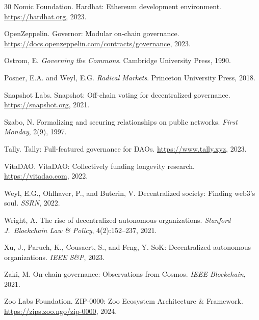 \documentclass[11pt,letterpaper]{article}
\begin{document}
\begin{thebibliography}{30}
Nomic Foundation.
\newblock Hardhat: Ethereum development environment.
\newblock \url{https://hardhat.org}, 2023.

OpenZeppelin.
\newblock Governor: Modular on-chain governance.
\newblock \url{https://docs.openzeppelin.com/contracts/governance}, 2023.

Ostrom, E.
\newblock \emph{Governing the Commons}.
\newblock Cambridge University Press, 1990.

Posner, E.A. and Weyl, E.G.
\newblock \emph{Radical Markets}.
\newblock Princeton University Press, 2018.

Snapshot Labs.
\newblock Snapshot: Off-chain voting for decentralized governance.
\newblock \url{https://snapshot.org}, 2021.

Szabo, N.
\newblock Formalizing and securing relationships on public networks.
\newblock \emph{First Monday}, 2(9), 1997.

Tally.
\newblock Tally: Full-featured governance for DAOs.
\newblock \url{https://www.tally.xyz}, 2023.

VitaDAO.
\newblock VitaDAO: Collectively funding longevity research.
\newblock \url{https://vitadao.com}, 2022.

Weyl, E.G., Ohlhaver, P., and Buterin, V.
\newblock Decentralized society: Finding web3's soul.
\newblock \emph{SSRN}, 2022.

Wright, A.
\newblock The rise of decentralized autonomous organizations.
\newblock \emph{Stanford J.\ Blockchain Law \& Policy}, 4(2):152--237, 2021.

Xu, J., Paruch, K., Cousaert, S., and Feng, Y.
\newblock SoK: Decentralized autonomous organizations.
\newblock \emph{IEEE S\&P}, 2023.

Zaki, M.
\newblock On-chain governance: Observations from Cosmos.
\newblock \emph{IEEE Blockchain}, 2021.

Zoo Labs Foundation.
\newblock ZIP-0000: Zoo Ecosystem Architecture \& Framework.
\newblock \url{https://zips.zoo.ngo/zip-0000}, 2024.


\end{thebibliography}
\end{document}
